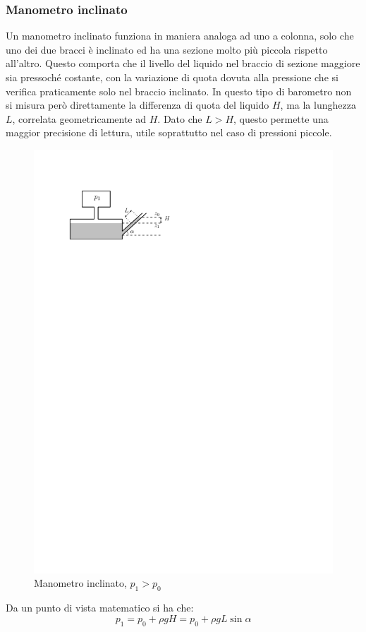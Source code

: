 \subsubsection{Manometro inclinato}
Un manometro inclinato funziona in maniera analoga ad uno a colonna, solo che uno dei due bracci è inclinato ed ha una sezione molto più piccola rispetto all'altro.
Questo comporta che il livello del liquido nel braccio di sezione maggiore sia pressoché costante, con la variazione di quota dovuta alla pressione che si verifica praticamente solo nel braccio inclinato.
In questo tipo di barometro non si misura però direttamente la differenza di quota del liquido $H$, ma la lunghezza $L$, correlata geometricamente ad $H$.
Dato che $L > H$, questo permette una maggior precisione di lettura, utile soprattutto nel caso di pressioni piccole.
	\begin{figure}[H]
		\includegraphics[scale=1.25]{./2.3 Manometri/2.3-3}
		\centering
		\caption{Manometro inclinato, $p_1 > p_0$}
	\end{figure}
Da un punto di vista matematico si ha che:
	\begin{equation*}
		p_1 = p_0 + \rho g H = p_0 + \rho g L \sin{\alpha}
	\end{equation*}
